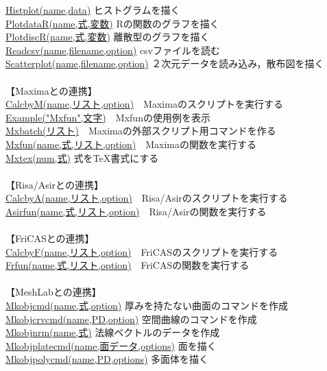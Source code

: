 \documentclass[papersize,a4paper,12pt,uplatex]{jsarticle}
\begin{document}
\begin{tabbing}
\hyperlink{histplot}{Histplot(name,data)}  \>ヒストグラムを描く\\
\hyperlink{plotdatar}{PlotdataR(name,式,変数)}  \>Rの関数のグラフを描く\\
\hyperlink{plotdiscr}{PlotdiscR(name,式,変数)}  \>離散型のグラフを描く\\
\hyperlink{readcsv}{Readcsv(name,filename,option)}  \>csvファイルを読む\\
\hyperlink{scatterplot}{Scatterplot(name,filename,option)}  \>２次元データを読み込み，散布図を描く\\
　\\
【Maximaとの連携】\\
\hyperlink{calcbyM}{CalcbyM(name,リスト,option)}　\>Maximaのスクリプトを実行する\\
\hyperlink{example}{Example("Mxfun",文字)}　\>Mxfunの使用例を表示\\
\hyperlink{mxbatch}{Mxbatch(リスト)}　\>Maximaの外部スクリプト用コマンドを作る\\
\hyperlink{mxfun}{Mxfun(name,式,リスト,option)}　\>Maximaの関数を実行する\\
\hyperlink{mxtex}{Mxtex(num,式)}  \>式をTeX書式にする\\
　\\
【Risa/Asirとの連携】\\
\hyperlink{calcbyA}{CalcbyA(name,リスト,option)}　\>Risa/Asirのスクリプトを実行する\\
\hyperlink{asirfun}{Asirfun(name,式,リスト,option)}　\>Risa/Asirの関数を実行する\\
　\\
【FriCASとの連携】\\
\hyperlink{calcbyF}{CalcbyF(name,リスト,option)}　\>FriCASのスクリプトを実行する\\
\hyperlink{frfun}{Frfun(name,式,リスト,option)}　\>FriCASの関数を実行する\\
　\\
【MeshLabとの連携】\\
\hyperlink{mkobjcmd}{Mkobjcmd(name,式,option)} \>厚みを持たない曲面のコマンドを作成\\
\hyperlink{mkobjcrvcmd}{Mkobjcrvcmd(name,PD,option)} \>空間曲線のコマンドを作成\\
\hyperlink{mkobjnrm}{Mkobjnrm(name,式)} \>法線ベクトルのデータを作成\\
\hyperlink{mkobjplatecmd}{Mkobjplatecmd(name,面データ,options)} \>面を描く\\
\hyperlink{mkobjpolycmd}{Mkobjpolycmd(name,PD,options)} \>多面体を描く\\

\end{tabbing}
\end{document}
